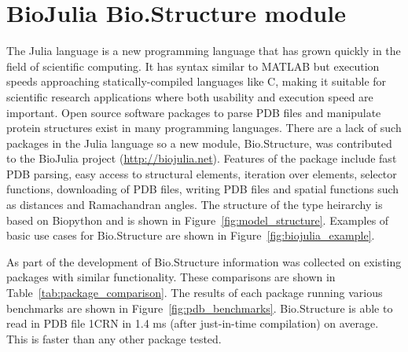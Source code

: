 \section*{BioJulia Bio.Structure module}
\label{sec:appendices_biojulia}

The Julia language \cite{Bezanson2017} is a new programming language that has grown quickly in the field of scientific computing.
It has syntax similar to MATLAB but execution speeds approaching statically-compiled languages like C, making it suitable for scientific research applications where both usability and execution speed are important.
Open source software packages to parse PDB files and manipulate protein structures exist in many programming languages.
There are a lack of such packages in the Julia language so a new module, Bio.Structure, was contributed to the BioJulia project (\url{http://biojulia.net}).
Features of the package include fast PDB parsing, easy access to structural elements, iteration over elements, selector functions, downloading of PDB files, writing PDB files and spatial functions such as distances and Ramachandran angles.
The structure of the type heirarchy is based on Biopython \cite{Cock2009} and is shown in Figure~\ref{fig:model_structure}.
Examples of basic use cases for Bio.Structure are shown in Figure~\ref{fig:biojulia_example}.

As part of the development of Bio.Structure information was collected on existing packages with similar functionality.
These comparisons are shown in Table~\ref{tab:package_comparison}.
The results of each package running various benchmarks are shown in Figure~\ref{fig:pdb_benchmarks}.
Bio.Structure is able to read in PDB file 1CRN in 1.4 ms (after just-in-time compilation) on average.
This is faster than any other package tested.


